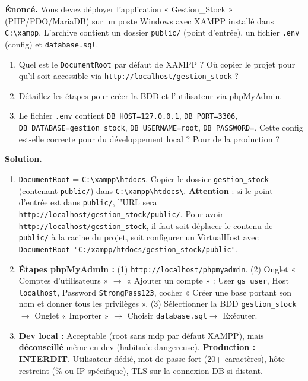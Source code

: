 \documentclass[11pt]{article}
\begin{document}
\begin{exoresolu}
\textbf{Énoncé.} Vous devez déployer l'application « Gestion\_Stock » (PHP/PDO/MariaDB) sur un poste Windows avec XAMPP installé dans \texttt{C:\textbackslash xampp}. L'archive contient un dossier \texttt{public/} (point d'entrée), un fichier \texttt{.env} (config) et \texttt{database.sql}.
\begin{enumerate}
\item Quel est le \texttt{DocumentRoot} par défaut de XAMPP ? Où copier le projet pour qu'il soit accessible via \texttt{http://localhost/gestion\_stock} ?
\item Détaillez les étapes pour créer la BDD et l'utilisateur via phpMyAdmin.
\item Le fichier \texttt{.env} contient \texttt{DB\_HOST=127.0.0.1}, \texttt{DB\_PORT=3306}, \texttt{DB\_DATABASE=gestion\_stock}, \texttt{DB\_USERNAME=root}, \texttt{DB\_PASSWORD=}. Cette config est-elle correcte pour du développement local ? Pour de la production ?
\end{enumerate}
\tcblower
\textbf{Solution.}
\begin{enumerate}
\item \texttt{DocumentRoot} = \texttt{C:\textbackslash xampp\textbackslash htdocs}. Copier le dossier \texttt{gestion\_stock} (contenant \texttt{public/}) dans \texttt{C:\textbackslash xampp\textbackslash htdocs\textbackslash}. \textbf{Attention} : si le point d'entrée est dans \texttt{public/}, l'URL sera \texttt{http://localhost/gestion\_stock/public/}. Pour avoir \texttt{http://localhost/gestion\_stock}, il faut soit déplacer le contenu de \texttt{public/} à la racine du projet, soit configurer un VirtualHost avec \texttt{DocumentRoot "C:/xampp/htdocs/gestion\_stock/public"}.
\item \textbf{Étapes phpMyAdmin :} (1) \texttt{http://localhost/phpmyadmin}. (2) Onglet « Comptes d'utilisateurs » $\rightarrow$ « Ajouter un compte » : User \texttt{gs\_user}, Host \texttt{localhost}, Password \texttt{StrongPass123}, cocher « Créer une base portant son nom et donner tous les privilèges ». (3) Sélectionner la BDD \texttt{gestion\_stock} $\rightarrow$ Onglet « Importer » $\rightarrow$ Choisir \texttt{database.sql}$\rightarrow$ Exécuter.
\item \textbf{Dev local :} Acceptable (root sans mdp par défaut XAMPP), mais \textbf{déconseillé} même en dev (habitude dangereuse). \textbf{Production :} \textbf{INTERDIT}. Utilisateur dédié, mot de passe fort (20+ caractères), hôte restreint (\% ou IP spécifique), TLS sur la connexion DB si distant.
\end{enumerate}
\end{exoresolu}
\end{document}
